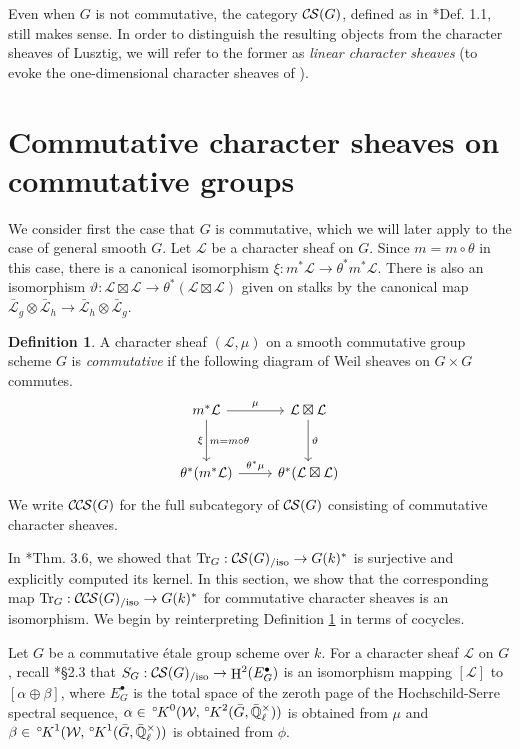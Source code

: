 \documentclass[10pt]{amsart}
\theoremstyle{plain}
\theoremstyle{definition}
\newtheorem{definition}[theorem]{Definition}
\newcommand{\EE}{\mathbb{\bar Q}_\ell}
\newcommand{\EEx}{\EE^\times}
\newcommand{\Weil}[1]{\mathcal{W}_{#1}}
\DeclareMathOperator{\Hh}{H}
\DeclareMathOperator{\Tr}{Tr}
\newcommand{\TrFrob}[1]{\Tr_{#1}}
\newcommand{\cs}[1]{{\mathcal{#1}}}
\newcommand{\gcs}[1]{{\mathcal{\bar #1}}}
\newcommand{\CS}{{\mathcal{C\hskip-0.8pt S}}}
\newcommand{\CCS}{{\mathcal{C\hskip-.8pt C\hskip-0.8pt S}}}
\newcommand{\CSiso}[1]{\CS(#1)_{/\text{iso}}}
\newcommand{\CCSiso}[1]{\CCS(#1)_{/\text{iso}}}
\newcommand{\bG}{\bar{G}}
\newcommand{\oK}{{\,^\circ \hskip-1pt K}}
\begin{document}
Even when $G$ is not commutative, the category $\CS(G)$, defined as in \cite{cunningham-roe:13a}*{Def. 1.1},
still makes sense.  In order to distinguish the resulting objects from
the character sheaves of Lusztig, we will refer to the former as \emph{linear character sheaves}
(to evoke the one-dimensional character sheaves of \cite{kamgarpour:09a}).

\section{Commutative character sheaves on commutative groups}\label{sec:comcom}

We consider first the case that $G$ is commutative, which we will later apply to the case of general smooth $G$.
Let $\cs{L}$ be a character sheaf on $G$.  Since $m = m \circ \theta$ in this case,
there is a canonical isomorphism $\xi : m^* \cs{L} \to \theta^* m^* \cs{L}$.
There is also an isomorphism $\vartheta : \cs{L}\boxtimes\cs{L} \to \theta^*(\cs{L}\boxtimes\cs{L})$
given on stalks by the canonical map $\gcs{L}_{g} \otimes \gcs{L}_{h} \to \gcs{L}_{h} \otimes \gcs{L}_{g}$.

\begin{definition}\label{def:CCScom}
A character sheaf $(\cs{L}, \mu)$ on a smooth commutative group scheme $G$ is \emph{commutative}
if the following diagram of Weil sheaves on $G \times G$ commutes.
  \[
  \begin{tikzcd}[row sep=30]
   m^*\cs{L} \arrow{d}[swap]{\xi}{m= m\circ\theta} \arrow{r}{\mu} & \cs{L}\boxtimes\cs{L} \arrow{d}{\vartheta}\\
   \theta^*(m^*\cs{L}) \arrow{r}{{\theta}^*\mu} &  \theta^*(\cs{L}\boxtimes\cs{L})
  \end{tikzcd}
  \]
We write $\CCS(G)$ for the full subcategory of $\CS(G)$ consisting of commutative character sheaves.
 \end{definition}

In \cite{cunningham-roe:13a}*{Thm. 3.6}, we showed that $\TrFrob{G} : \CSiso{G} \to G(k)^*$ is surjective and
explicitly computed its kernel.  In this section, we show that the corresponding map
$\TrFrob{G} : \CCSiso{G} \to G(k)^*$ for commutative character sheaves is an isomorphism.
We begin by reinterpreting Definition \ref{def:CCScom} in terms of cocycles.

Let $G$ be a commutative \'etale group scheme over $k$. For a character sheaf $\cs{L}$ on $G$, recall
\cite{cunningham-roe:13a}*{\S 2.3} that $S_G : \CSiso{G} \to \Hh^2(E_G^\bullet)$ is an isomorphism mapping
$[\cs{L}]$ to $[\alpha \oplus \beta]$, where $E_G^\bullet$ is the total space of the zeroth page
of the Hochschild-Serre spectral sequence, $\alpha \in \oK^0(\Weil{}, \oK^2(\bG, \EEx))$ is obtained from $\mu$ and
$\beta \in \oK^1(\Weil{}, \oK^1(\bG, \EEx))$ is obtained from $\phi$.
\end{document}
